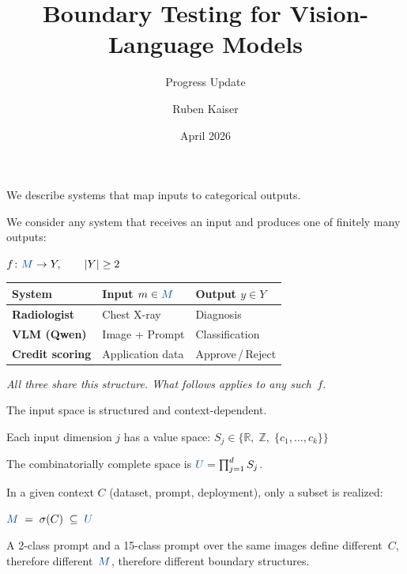 \documentclass[aspectratio=169, 10pt, t]{beamer}
\title{Boundary Testing for Vision-Language Models}
\subtitle{Progress Update}
\author{Ruben Kaiser}
\institute{Supervisors: Oliver Karras, Andrea Stocco\;\textbar\;TUM}
\date{April 2026}
\newcommand{\Mb}{\textcolor{tumsec}{M}}
\newcommand{\Ub}{\textcolor{tumsec}{U}}
\newcommand{\mathstrip}[1]{%
  \par\vspace{4pt}%
  \colorbox{tumbg}{\hspace{0.02\textwidth}\parbox{0.92\textwidth}{\vspace{6pt}%
    \centering #1%
  \vspace{6pt}}}\hspace{0.02\textwidth}%
  \par\vspace{4pt}%
}
\newcommand{\sidenote}[1]{%
  \par\vspace{4pt}%
  \hspace{2pt}{\color{tumgray}\vrule width 1.5pt}\hspace{8pt}%
  \parbox{\dimexpr\textwidth-14pt}{\footnotesize\color{tumgray}#1}%
  \par\vspace{2pt}%
}
\begin{document}
\maketitle

\begin{frame}{We describe systems that map inputs to categorical outputs.}

We consider any system that receives an input and produces one of finitely many outputs:

\mathstrip{$\displaystyle
  f \colon \textcolor{tumsec}{M} \to Y, \qquad |Y| \geq 2
$}

\vspace{2pt}

\begin{tabularx}{\textwidth}{@{}>{\bfseries}l Xl@{}}
\toprule
System & Input\; $m \in \textcolor{tumsec}{M}$ & \textbf{Output}\; $y \in Y$ \\
\midrule
Radiologist        & Chest X-ray        & Diagnosis \\
VLM (Qwen)         & Image + Prompt     & Classification \\
Credit scoring     & Application data   & Approve\,/\,Reject \\
\bottomrule
\end{tabularx}

\vspace{8pt}
\textit{\color{tumgray}All three share this structure. What follows applies to any such~$f$.}

\end{frame}

\begin{frame}{The input space is structured and context-dependent.}

Each input dimension $j$ has a value space:\;
$S_j \in \bigl\{\mathbb{R},\; \mathbb{Z},\; \{c_1, \ldots, c_k\}\bigr\}$

\vspace{2pt}
The combinatorially complete space is\; $\Ub = \prod_{j=1}^{d} S_j$.

\vspace{4pt}
In a given context $C$ (dataset, prompt, deployment), only a subset is realized:

\mathstrip{$\displaystyle
  \textcolor{tumsec}{M} \;=\; \sigma(C) \;\subseteq\; \textcolor{tumsec}{U}
$}

\vspace{4pt}
\sidenote{A 2-class prompt and a 15-class prompt over the same images define different~$C$, therefore different~$\Mb$, therefore different boundary structures.}

\end{frame}
\end{document}
